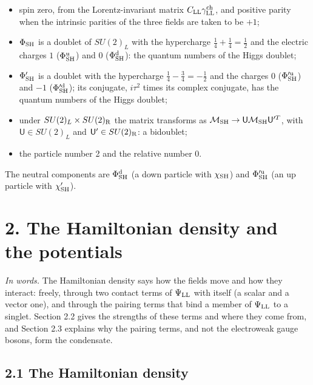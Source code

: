\documentclass[
  10pt,
]{article}
\providecommand{\tightlist}{%
  \setlength{\itemsep}{0pt}\setlength{\parskip}{0pt}}
\begin{document}
\begin{itemize}
\tightlist
\item
  spin zero, from the Lorentz-invariant matrix
  \(C_{\rm LL}\gamma^{\rm ch}_{\rm LL}\), and positive parity when the
  intrinsic parities of the three fields are taken to be \(+1\);
\item
  \(\Phi_{\rm SH}\) is a doublet of \(SU(2)_L\) with the hypercharge
  \(\tfrac14+\tfrac14=\tfrac12\) and the electric charges \(1\)
  (\(\Phi^{\rm u}_{\rm SH}\)) and 0 (\(\Phi^{\rm d}_{\rm SH}\)): the
  quantum numbers of the Higgs doublet;
\item
  \(\Phi'_{\rm SH}\) is a doublet with the hypercharge
  \(\tfrac14-\tfrac34=-\tfrac12\) and the charges 0
  (\(\Phi'^{\rm u}_{\rm SH}\)) and \(-1\) (\(\Phi'^{\rm d}_{\rm SH}\));
  its conjugate, \(i\tau^2\) times its complex conjugate, has the
  quantum numbers of the Higgs doublet;
\item
  under \(SU(2)_L\times SU(2)_{\rm R}\) the matrix transforms as
  \(\mathcal M_{\rm SH}\to\mathsf U\mathcal M_{\rm SH}\mathsf U'^T\),
  with \(\mathsf U\in SU(2)_L\) and \(\mathsf U'\in SU(2)_{\rm R}\): a
  bidoublet;
\item
  the particle number 2 and the relative number 0.
\end{itemize}

The neutral components are \(\Phi^{\rm d}_{\rm SH}\) (a down particle
with \(\chi_{\rm SH}\)) and \(\Phi'^{\rm u}_{\rm SH}\) (an up particle
with \(\chi'_{\rm SH}\)).

\hypertarget{the-hamiltonian-density-and-the-potentials}{%
\section{2. The Hamiltonian density and the
potentials}\label{the-hamiltonian-density-and-the-potentials}}

\emph{In words.} The Hamiltonian density says how the fields move and
how they interact: freely, through two contact terms of
\(\Psi_{\rm LL}\) with itself (a scalar and a vector one), and through
the pairing terms that bind a member of \(\Psi_{\rm LL}\) to a singlet.
Section 2.2 gives the strengths of these terms and where they come from,
and Section 2.3 explains why the pairing terms, and not the electroweak
gauge bosons, form the condensate.

\hypertarget{the-hamiltonian-density}{%
\subsection{2.1 The Hamiltonian density}\label{the-hamiltonian-density}}
\end{document}
